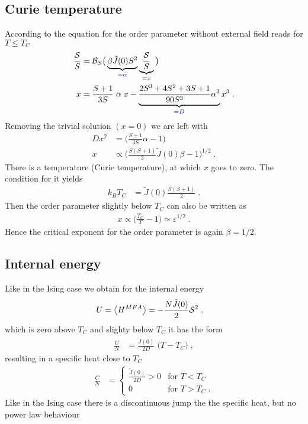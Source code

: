 \subsection{Curie temperature}
According to  the equation for the order parameter without external field
reads for $T\le T_{C}$
\begin{align*}
\frac{{\cal S}}{S} &= 
{\cal B}_{S}\big(\underbrace{
\beta\tilde J(0)S^{2}
}_{\color{blue} = \alpha}\underbrace{
\frac{{\cal S}}{S} 
}_{\color{blue} = x} \big)\\
x&=\frac{S+1}{3 S}\;\alpha\; x -\underbrace{
\frac{2S^{3}+4S^{2}+3S+1}{90 S^{3}}\alpha^{3} 
}_{\color{blue} = D}x^{3}\;.
\end{align*}
Removing the trivial solution $(x=0)$ we are left with
%
\begin{align*}
D x^{2}&=\big(\frac{S+1}{3S} \alpha -1\big)\\
x &\propto \bigg(\frac{S(S+1)}{3} \tilde J(0)\beta -1  \bigg) ^{1/2}\;.
\end{align*}
%
There is a temperature (Curie temperature), at which $x$ goes to zero. The condition for it 
yields
%
\begin{align}
k_{B}T_{C} &= \tilde J(0)\frac{S(S+1)}{2}\;.
\end{align}
%
Then the order parameter slightly below $T_{C}$ can also be written as
%
\begin{align*}
x\propto \bigg( \frac{T_{C}}{T}-1 \bigg) \simeq \varepsilon^{1/2} \;.
\end{align*}
%
Hence the critical exponent for the order parameter is again $\beta=1/2$.

\subsection{Internal energy}

Like in the Ising case we obtain for the internal energy
%
\begin{align}\label{eq:}
U &= \left\langle H^{MFA}\right\rangle = -\frac{N \tilde J(0)}{2}  {\cal S}^{2} 
\;,
\end{align}
%
which is zero above $T_{C}$ and slighty below $T_{C}$ it has the form
%
\begin{align*}
\frac{U}{N}&=\frac{\tilde J(0)}{2 D}\; \big(T- T_{C}\big)\;,
\end{align*}
%
resulting in a specific heat close to $T_{C}$
%
\begin{align*}
\frac{C}{N} &=
\begin{cases}
	\frac{\tilde J(0)}{2D}>0 &\text{for } T< T_{C}\\
	0&\text{for } T> T_{C}\;.
\end{cases}
\end{align*}
%
Like in the Ising case there is a discontinuous jump the the specific heat, but no power law behaviour
